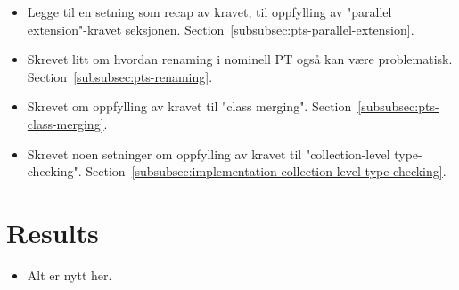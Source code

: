 \begin{itemize}
    \item Legge til en setning som recap av kravet, til oppfylling av "parallel extension"-kravet seksjonen.
    Section~\vref{subsubsec:pts-parallel-extension}.
    \item Skrevet litt om hvordan renaming i nominell PT også kan være problematisk.
    Section~\vref{subsubsec:pts-renaming}.
    \item Skrevet om oppfylling av kravet til "class merging".
    Section~\vref{subsubsec:pts-class-merging}.
    \item Skrevet noen setninger om oppfylling av kravet til "collection-level type-checking".
    Section~\vref{subsubsec:implementation-collection-level-type-checking}.
\end{itemize}

\section*{Results}

\begin{itemize}
    \item Alt er nytt her.
\end{itemize}
